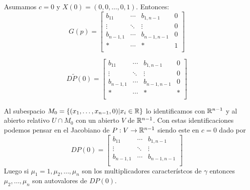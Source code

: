 \begin{teorema}{}
 Asumamos $c=0$ y $X(0)=(0,0,\ldots,0,1)$. Entonces:
 \begin{equation}\label{gp}G(p)=\begin{bmatrix}
         b_{11}&\cdots&b_{1,n-1}&0\\
        \vdots &\ddots&\vdots&0\\
         b_{n-1,1}&\cdots&b_{n-1,n-1}&0\\
         *&\cdots&*&1\\
        \end{bmatrix}
 \end{equation}
 
 \begin{equation}\label{dptil}D\tilde{P}(0)=\begin{bmatrix}
         b_{11}&\cdots&b_{1,n-1}&0\\
        \vdots &\ddots&\vdots&0\\
         b_{n-1,1}&\cdots&b_{n-1,n-1}&0\\
         *&\cdots&*&*\\
        \end{bmatrix}
\end{equation}


Al subespacio $M_0=\{(x_1,\ldots,x_{n-1},0)|x_i\in\mathbb{R}\}$ lo identificamos con $\mathbb{R}^{n-1}$ y al abierto relativo $U\cap M_0$ con un abierto $V$ de $\mathbb{R}^{n-1}$. 
Con estas identificaciones podemos pensar en el Jacobiano de $P:V\to \mathbb{R}^{n-1}$ siendo este en $c=0$ dado por
 \begin{equation}\label{dp}DP(0)=\begin{bmatrix}
         b_{11}&\cdots&b_{1,n-1}\\
        \vdots &\ddots&\vdots\\
         b_{n-1,1}&\cdots&b_{n-1,n-1}\\
        \end{bmatrix}
\end{equation}
Luego si $\mu_1=1,\mu_2,\ldots,\mu_n$ son los multiplicadores característcos de $\gamma$ entonces $\mu_2,\ldots,\mu_n$ son autovalores de $DP(0)$.

\end{teorema}





